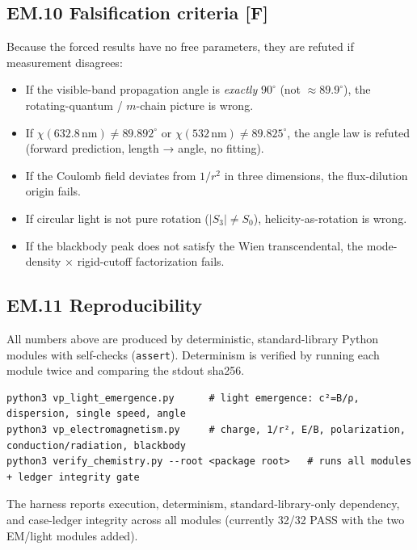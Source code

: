 \documentclass[
  10pt,
]{article}
\providecommand{\tightlist}{%
  \setlength{\itemsep}{0pt}\setlength{\parskip}{0pt}}
\begin{document}
\hypertarget{em.10-falsification-criteria-f}{%
\subsection{\texorpdfstring{EM.10 Falsification criteria
\textbf{{[}F{]}}}{EM.10 Falsification criteria {[}F{]}}}\label{em.10-falsification-criteria-f}}

Because the forced results have no free parameters, they are refuted if
measurement disagrees:

\begin{itemize}
\tightlist
\item
  If the visible-band propagation angle is \emph{exactly} \(90^\circ\)
  (not \(\approx 89.9^\circ\)), the rotating-quantum / \(m\)-chain
  picture is wrong.
\item
  If \(\chi(632.8\,\text{nm}) \neq 89.892^\circ\) or
  \(\chi(532\,\text{nm}) \neq 89.825^\circ\), the angle law is refuted
  (forward prediction, length → angle, no fitting).
\item
  If the Coulomb field deviates from \(1/r^2\) in three dimensions, the
  flux-dilution origin fails.
\item
  If circular light is not pure rotation (\(|S_3| \neq S_0\)),
  helicity-as-rotation is wrong.
\item
  If the blackbody peak does not satisfy the Wien transcendental, the
  mode-density × rigid-cutoff factorization fails.
\end{itemize}

\hypertarget{em.11-reproducibility}{%
\subsection{EM.11 Reproducibility}\label{em.11-reproducibility}}

All numbers above are produced by deterministic, standard-library Python
modules with self-checks (\texttt{assert}). Determinism is verified by
running each module twice and comparing the stdout sha256.

\begin{verbatim}
python3 vp_light_emergence.py      # light emergence: c²=B/ρ, dispersion, single speed, angle
python3 vp_electromagnetism.py     # charge, 1/r², E/B, polarization, conduction/radiation, blackbody
python3 verify_chemistry.py --root <package root>   # runs all modules + ledger integrity gate
\end{verbatim}

The harness reports execution, determinism, standard-library-only
dependency, and case-ledger integrity across all modules (currently
32/32 PASS with the two EM/light modules added).
\end{document}
